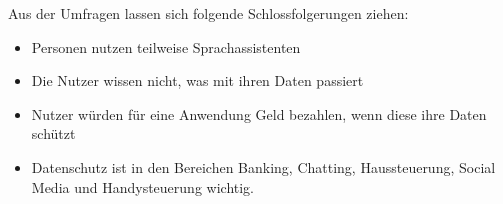 Aus der Umfragen lassen sich folgende Schlossfolgerungen ziehen:
\begin{itemize}	
	\item Personen nutzen teilweise Sprachassistenten
	\item Die Nutzer wissen nicht, was mit ihren Daten passiert
	\item Nutzer würden für eine Anwendung Geld bezahlen, wenn diese ihre Daten schützt
	\item Datenschutz ist in den Bereichen Banking, Chatting, Haussteuerung, Social Media und Handysteuerung wichtig.
\end{itemize}
